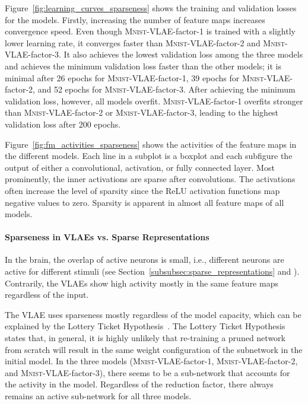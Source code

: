 Figure~\ref{fig:learning_curves_sparseness} shows the training and validation losses for the models.
Firstly, increasing the number of feature maps increases convergence speed.
Even though \textsc{Mnist}-\ac{VLAE}-factor-1 is trained with a slightly lower learning rate, it converges faster than \textsc{Mnist}-\ac{VLAE}-factor-2 and \textsc{Mnist}-\ac{VLAE}-factor-3.
It also achieves the lowest validation loss among the three models and achieves the minimum validation loss faster than the other models; it is minimal after 26 epochs for \textsc{Mnist}-\ac{VLAE}-factor-1, 39 epochs for \textsc{Mnist}-\ac{VLAE}-factor-2, and 52 epochs for \textsc{Mnist}-\ac{VLAE}-factor-3.
After achieving the minimum validation loss, however, all models overfit.
\textsc{Mnist}-\ac{VLAE}-factor-1 overfits stronger than \textsc{Mnist}-\ac{VLAE}-factor-2 or \textsc{Mnist}-\ac{VLAE}-factor-3, leading to the highest validation loss after 200 epochs.

Figure~\ref{fig:fm_activities_sparseness} shows the activities of the feature maps in the different models.
Each line in a subplot is a boxplot and each subfigure the output of either a convolutional, activation, or fully connected layer.
Most prominently, the inner activations are sparse after convolutions.
The activations often increase the level of sparsity since the ReLU activation functions map negative values to zero.
Sparsity is apparent in almost all feature maps of all models.

\paragraph{Sparseness in \acp{VLAE} vs. Sparse Representations}
In the brain, the overlap of active neurons is small, i.e., different neurons are active for different stimuli (see Section~\ref{subsubsec:sparse_representations} and \citet{yoshida2020natural}).
Contrarily, the \acp{VLAE} show high activity mostly in the same feature maps regardless of the input.

The \ac{VLAE} uses sparseness mostly regardless of the model capacity, which can be explained by the Lottery Ticket Hypothesis~\citep{frankle2018lottery}.
The Lottery Ticket Hypothesis states that, in general, it is highly unlikely that re-training a pruned network from scratch will result in the same weight configuration of the subnetwork in the initial model.
In the three models (\textsc{Mnist}-\ac{VLAE}-factor-1, \textsc{Mnist}-\ac{VLAE}-factor-2, and \textsc{Mnist}-\ac{VLAE}-factor-3), there seems to be a sub-network that accounts for the activity in the model.
Regardless of the reduction factor, there always remains an active sub-network for all three models.

